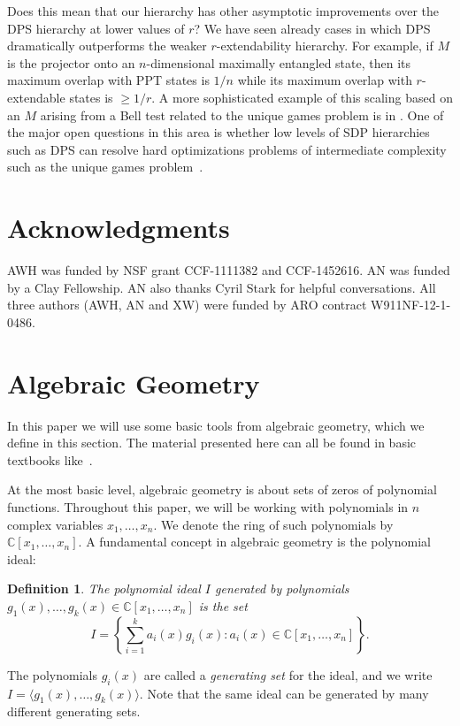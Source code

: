 \documentclass[aps,pra,notitlepage,preprintnumbers,11pt,tightenlines]{revtex4-1}
\newcommand{\CC}{\mathbb{C}}
\newtheorem{definition}[theorem]{Definition}
\begin{document}
Does this mean that our hierarchy has other asymptotic improvements
over the DPS hierarchy at lower values of $r$?  We have seen already
cases in which DPS dramatically outperforms the weaker
$r$-extendability hierarchy.  For example, if $M$ is the projector
onto an $n$-dimensional maximally entangled state, then its maximum
overlap with PPT states is $1/n$ while its maximum overlap with
$r$-extendable states is $\geq 1/r$.  A more sophisticated example of
this scaling based on an $M$ arising from a Bell test related to the
unique games problem is in \cite{BuhrmanRSW11}.  One of the major open
questions in this area is whether low levels of SDP hierarchies such
as DPS can resolve hard optimizations problems of intermediate
complexity such as the unique games problem~\cite{BBHKSZ12}.   


\section*{Acknowledgments}
AWH was funded by NSF grant CCF-1111382 and CCF-1452616. AN was
funded by a Clay Fellowship. AN also thanks Cyril Stark for helpful
conversations.  All three authors (AWH, AN and XW) were funded by ARO
contract W911NF-12-1-0486.


\appendix
\section{Algebraic Geometry} \label{sec:alg-geom}
\label{subsec:alg-geom-basics}

In this paper we will use some basic tools from algebraic
geometry, which we define in this section. The material presented here
can all be found in basic textbooks like~\cite{clo:1996,harris:1992}.

At the most basic level, algebraic geometry is about sets of zeros of
polynomial functions. Throughout this paper, we will be working with polynomials in $n$
complex variables $x_1, \dots, x_n$. We denote the ring of such polynomials by
$\CC[x_1, \dots, x_n]$. A fundamental concept in algebraic geometry is
the polynomial ideal:
\begin{definition}
The \emph{polynomial ideal} $I$ generated by polynomials $g_1(x), \dots,
g_k(x) \in \CC[x_1, \dots, x_n]$ is the set
\[ I = \left\{ \sum_{i=1}^k a_i(x) g_i(x) : a_i(x) \in \CC[x_1, \dots, x_n]
\right\}. \]
\end{definition}
The polynomials $g_i(x)$ are called a
\emph{generating set} for the ideal, and we write $I =\langle g_1(x),
\dots, g_k(x) \rangle$. Note that the same ideal can be generated by many
different generating sets.
\end{document}
